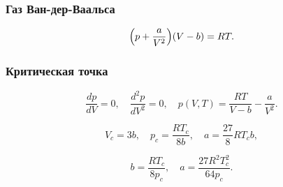 \documentclass[12pt, a4paper]{article}
\begin{document}
\subsubsection*{Газ Ван-дер-Ваальса}
\[
\Bigl(p+\frac{a}{V^2}\Bigr)(V-b) = RT.
\]

\subsubsection*{Критическая точка}
\[
\frac{dp}{dV}=0, \quad \frac{d^2 p}{dV^2}=0,
\quad p(V,T)=\frac{RT}{V-b} - \frac{a}{V^2}.
\]

\[
V_c=3b, \quad p_c=\frac{RT_c}{8b}, \quad a=\frac{27}{8}RT_c b,
\]

\[
\boxed{b=\frac{RT_c}{8p_c}, \quad a=\frac{27 R^2 T_c^2}{64 p_c}}.
\]
\end{document}
